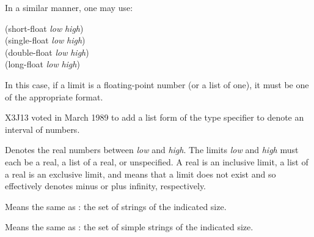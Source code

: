 \begin{flushdesc}
In a similar manner, one may use:
\begin{lisp}
(short-float \emph{low} \emph{high}) \\
(single-float \emph{low} \emph{high}) \\
(double-float \emph{low} \emph{high}) \\
(long-float \emph{low} \emph{high})
\end{lisp}
In this case, if a limit is a floating-point
number (or a list of one), it must be one of the appropriate format.
\end{flushdesc}

\begin{newer}
X3J13 voted in March 1989  to add a list form of the 
type specifier to denote an interval of  numbers.

\begin{flushdesc}
\item[\cd{(real \emph{low} \emph{high})}]
Denotes the real numbers between
\emph{low} and \emph{high}.  The limits \emph{low} and \emph{high}
must each be a real, a list of a real, or unspecified.
A real is an inclusive limit,
a list of a real is an exclusive limit, and
\cdf{*} means that a limit does not exist
and so effectively denotes minus or plus infinity, respectively.
\end{flushdesc}
\end{newer}

\begin{obsolete}
\begin{flushdesc}
\item[\cd{(string \emph{size})}]
Means the same as
: the set of strings of the indicated size.

\item[\cd{(simple-string \emph{size})}]
Means the same
as : the set of simple
strings of the indicated size.
\end{flushdesc}
\end{obsolete}

